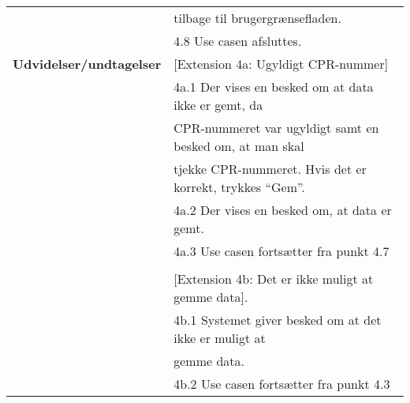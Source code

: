 \begin{table}[h!]
\begin{tabular}{l|l}
		& tilbage til brugergrænsefladen. \\
		& 4.8 Use casen afsluttes. \\
		\hline
		\rowcolor[HTML]{A9D9F9} 
		\textbf{Udvidelser/undtagelser} & {[}Extension 4a: Ugyldigt CPR-nummer{]} \\
		\rowcolor[HTML]{A9D9F9} 
		& 4a.1 Der vises en besked om at data ikke er gemt, da \\
		\rowcolor[HTML]{A9D9F9} 
		& CPR-nummeret var ugyldigt samt en besked om, at man skal \\
		\rowcolor[HTML]{A9D9F9} 
		& tjekke CPR-nummeret. Hvis det er korrekt, trykkes “Gem”. \\
		\rowcolor[HTML]{A9D9F9} 
		& 4a.2 Der vises en besked om, at data er gemt. \\
		\rowcolor[HTML]{A9D9F9} 
		& 4a.3 Use casen fortsætter fra punkt 4.7 \\
		\rowcolor[HTML]{A9D9F9} 
		&  \\
		\rowcolor[HTML]{A9D9F9} 
		& {[}Extension 4b: Det er ikke muligt at gemme data{]}. \\
		\rowcolor[HTML]{A9D9F9} 
		& 4b.1 Systemet  giver besked om at det ikke er muligt at \\
		\rowcolor[HTML]{A9D9F9} 
		& gemme data. \\
		\rowcolor[HTML]{A9D9F9} 
		& 4b.2 Use casen fortsætter fra punkt 4.3
	\end{tabular}
\end{table}
\clearpage